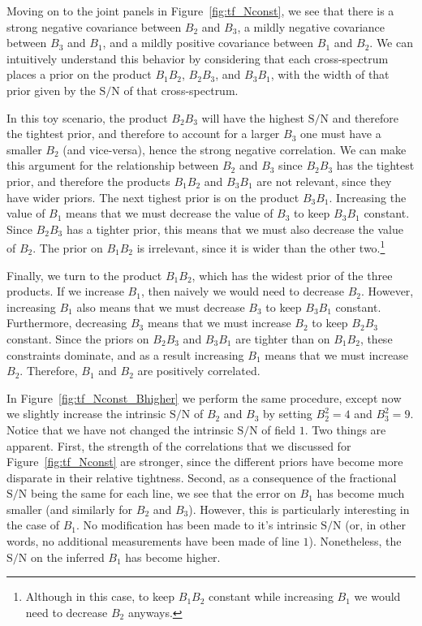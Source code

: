 \documentclass{aastex62}
\newcommand{\SN}{\ensuremath{\text{S}/\text{N}}}
\begin{document}
Moving on to the joint panels in Figure~\ref{fig:tf_Nconst}, we see that there
is a strong negative covariance between $B_2$ and $B_3$, a mildly negative
covariance between $B_3$ and $B_1$, and a mildly positive covariance between
$B_1$ and $B_2$. We can intuitively understand this behavior by considering
that each cross-spectrum places a prior on the product $B_1B_2$, $B_2B_3$, and
$B_3B_1$, with the width of that prior given by the \SN{} of that
cross-spectrum.

In this toy scenario, the product $B_2B_3$ will have the highest \SN{} and
therefore the tightest prior, and therefore to account for a larger $B_3$ one
must have a smaller $B_2$ (and vice-versa), hence the strong negative
correlation. We can make this argument for the relationship between $B_2$ and
$B_3$ since $B_2B_3$ has the tightest prior, and therefore the products
$B_1B_2$ and $B_3B_1$ are not relevant, since they have wider priors. The next
tighest prior is on the product $B_3B_1$. Increasing the value of $B_1$ means
that we must decrease the value of $B_3$ to keep $B_3B_1$ constant. Since
$B_2B_3$ has a tighter prior, this means that we must also decrease the value
of $B_2$. The prior on $B_1B_2$ is irrelevant, since it is wider than the
other two.\footnote{Although in this case, to keep $B_1B_2$ constant while
increasing $B_1$ we would need to decrease $B_2$ anyways.}

Finally, we turn to the product $B_1B_2$, which has the widest prior of the
three products. If we increase $B_1$, then naively we would need to decrease
$B_2$. However, increasing $B_1$ also means that we must decrease $B_3$ to
keep $B_3B_1$ constant. Furthermore, decreasing $B_3$ means that we must
increase $B_2$ to keep $B_2B_3$ constant. Since the priors on $B_2B_3$ and
$B_3B_1$ are tighter than on $B_1B_2$, these constraints dominate, and as a
result increasing $B_1$ means that we must increase $B_2$. Therefore, $B_1$
and $B_2$ are positively correlated.

In Figure~\ref{fig:tf_Nconst_Bhigher} we perform the same procedure, except
now we slightly increase the intrinsic \SN{} of $B_2$ and $B_3$ by setting
$B_2^2 = 4$ and $B_3^2 = 9$. Notice that we have not changed the intrinsic
\SN{} of field $1$. Two things are apparent. First, the strength of the
correlations that we discussed for Figure~\ref{fig:tf_Nconst} are stronger,
since the different priors have become more disparate in their relative
tightness. Second, as a consequence of the fractional \SN{} being the same for
each line, we see that the error on $B_1$ has become much smaller (and
similarly for $B_2$ and $B_3$). However, this is particularly interesting in
the case of $B_1$. No modification has been made to it's intrinsic \SN{} (or,
in other words, no additional measurements have been made of line $1$).
Nonetheless, the \SN{} on the inferred $B_1$ has become higher.
\end{document}
